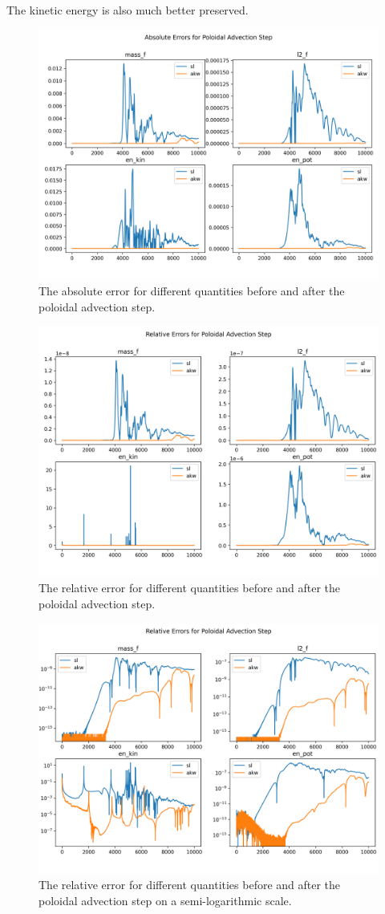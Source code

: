 The kinetic energy is also much better preserved.

\begin{figure}
	\centering
	\includegraphics[width=0.9\linewidth]{abs_err}
	\caption{The absolute error for different quantities before and after the poloidal advection step.}
	\label{fig:abserr}
\end{figure}


\begin{figure}
	\centering
	\includegraphics[width=0.9\linewidth]{rel_err}
	\caption{The relative error for different quantities before and after the poloidal advection step.}
	\label{fig:relerr}
\end{figure}


\begin{figure}
	\centering
	\includegraphics[width=0.9\linewidth]{rel_err_log}
	\caption{The relative error for different quantities before and after the poloidal advection step on a semi-logarithmic scale.}
	\label{fig:relerrlog}
\end{figure}



